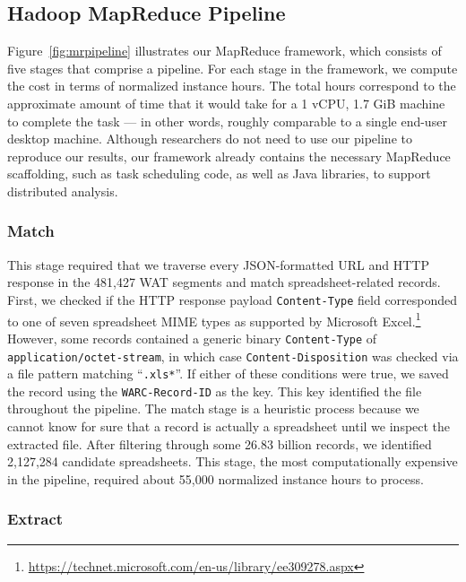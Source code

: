 \documentclass{svjour3}
\begin{document}
 

\subsection{Hadoop MapReduce Pipeline}

Figure~\ref{fig:mrpipeline} illustrates our MapReduce framework, which consists of five stages that comprise a pipeline. For each stage in the framework, we compute the cost in terms of normalized instance hours. The total hours correspond to the approximate amount of time that it would take for a 1 vCPU, 1.7 GiB machine to complete the task --- in other words, roughly comparable to a single end-user desktop machine.  Although researchers do not need to use our pipeline to reproduce our results, our framework already contains the necessary MapReduce scaffolding, such as task scheduling code, as well as Java libraries, to support distributed analysis.

\subsubsection{Match} 

This stage required that we traverse every JSON-formatted URL and HTTP response in the 481,427 WAT segments and match spreadsheet-related records. First, we checked if the HTTP response payload \texttt{Content-Type} field corresponded to one of seven spreadsheet MIME types as supported by Microsoft Excel.\footnote{\url{https://technet.microsoft.com/en-us/library/ee309278.aspx}} However, some records contained a generic binary \texttt{Content-Type} of \texttt{application/octet-stream}, in which case \texttt{Content-Disposition} was checked via a file pattern matching ``\texttt{.xls*}''. If either of these conditions were true, we saved the record using the \texttt{WARC-Record-ID} as the key. This key identified the file throughout the pipeline. The match stage is a heuristic process because we cannot know for sure that a record is actually a spreadsheet until we inspect the extracted file.  After filtering through some 26.83 billion records, we identified 2,127,284 candidate spreadsheets. This stage, the most computationally expensive in the pipeline, required about 55,000 normalized instance hours to process.

\subsubsection{Extract} 
\end{document}
